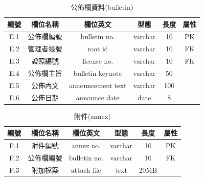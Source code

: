 \begin{table}[H]
\caption{公佈欄資料(bulletin)}
\label{tab:公佈欄資料}
\renewcommand{\arraystretch}{1} %
\arrayrulewidth=0.5pt               %
\centering
\begin{tabular}[t]{|c|c|c|c|c|c|}  %
\hline
編號 & 欄位名稱 & 欄位英文 & 型態 & 長度 & 屬性 \\
\hline
E.1 & 公佈欄編號 & bulletin no. & varchar & 10 & PK \\
\hline
E.2 & 管理者帳號 & root id & varchar & 10 & FK \\
\hline
E.3 & 證照編號 & license no. & varchar & 10 & FK \\
\hline
E.4 & 公佈欄主旨 & bulletin keynote & varchar & 50 & \\
\hline
E.5 & 公佈內文 & announcement text & varchar & 100 & \\
\hline
E.6 & 公佈日期 & announce date & date & 8 & \\
\hline
\end{tabular}
\end{table}

\begin{table}[H]
\caption{附件(annex)}
\label{tab:附件}
\renewcommand{\arraystretch}{1} %
\arrayrulewidth=0.5pt               %
\centering
\begin{tabular}[t]{|c|c|c|c|c|c|}  %
\hline
編號 & 欄位名稱 & 欄位英文 & 型態 & 長度 & 屬性 \\
\hline
F.1 & 附件編號 & annex no. & varchar & 10 & PK \\
\hline
F.2 & 公佈欄編號 & bulletin no. & varchar & 10 & FK \\
\hline
F.3 & 附加檔案 & attach file & text & 20MB &  \\
\hline
\end{tabular}
\end{table}

